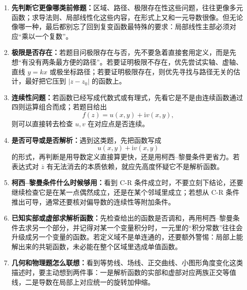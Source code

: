\begin{tishi}[做题时的判断思路]
\begin{enumerate}
    \item \textbf{先判断它更像哪类前修题：}区域、路径、极限存在性这些问题，往往更像多元函数；求导法则、局部线性化这些内容，在形式上又和一元导数很像。但无论像哪一种，最后都别忘了回到复变函数最特殊的要求：局部线性主部必须对应``乘以一个复数''。

    \item \textbf{极限是否存在：}若题目问极限存在与否，先不要急着直接套用定义，而是先想``有没有两条最方便的路径''。若要证明极限不存在，优先尝试实轴、虚轴、直线 $y=kx$ 或极坐标路径；若要证明极限存在，则优先寻找与路径无关的估计，最好把它压到 $|z-z_0|$ 的函数上。

    \item \textbf{连续性问题：}若函数已经写成代数式或有理式，先看它是不是由连续函数通过四则运算组合而成；若题目给出
    \[
        f(z)=u(x,y)+\mathrm{i}v(x,y),
    \]
    则可以直接转去检查 $u,v$ 在对应点是否连续。

    \item \textbf{是否可导或是否解析：}遇到这类题，先把函数写成
    \[
        u(x,y)+\mathrm{i}v(x,y)
    \]
    的形式，再判断是用导数定义直接算更快，还是用柯西--黎曼条件更省力。若表达式对 $\bar z$ 有无法消去的本质依赖，就应先高度怀疑它不是解析函数。

    \item \textbf{柯西--黎曼条件什么时候够用：}看到 C-R 条件成立时，不要立刻下结论，还要继续检查它是在某一点偶然成立，还是在某个邻域里成立；若想从 C-R 条件推出可导，通常还要核对偏导数的连续性等附加条件。

    \item \textbf{已知实部或虚部求解析函数：}先检查给出的函数是否调和，再用柯西--黎曼条件去求另一个部分，并记得对某一个变量积分时，一元里的``积分常数''往往会升级成另一个变量的函数。若定义域不是单连通的，还要额外警惕：局部上能解出来的共轭函数，未必能在整个区域里选成单值函数。

    \item \textbf{几何和物理题怎么联想：}看到等势线、场线、正交曲线、小图形角度变化这类描述时，要主动想到两件事：一是解析函数的实部和虚部对应两族正交等值线，二是导数在局部上对应统一的旋转加伸缩。
\end{enumerate}
\end{tishi}

